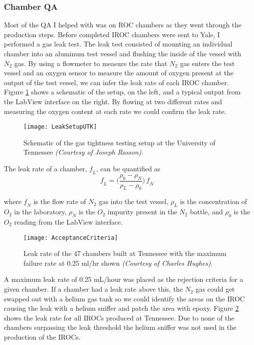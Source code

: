 \subsubsection{Chamber QA}

Most of the QA I helped with was on ROC chambers as they went through the production steps.  Before completed IROC chambers were sent to Yale, I performed a gas leak test.  The leak test consisted of mounting an individual chamber into an aluminum test vessel and flushing the inside of the vessel with $N_{2}$ gas.  By using a flowmeter to measure the rate that $N_{2}$ gas enters the test vessel and an oxygen sensor to measure the amount of oxygen present at the output of the test vessel, we can infer the leak rate of each IROC chamber.  Figure \ref{fig:LeakTest} shows a schematic of the setup, on the left, and a typical output from the LabView interface on the right.  By flowing at two different rates and measuring the oxygen content at each rate we could confirm the leak rate.

\begin{figure}[h]
\texttt{[image: LeakSetupUTK]}
\centering
\caption{Schematic of the gas tightness testing setup at the University of Tennessee \textit{(Courtesy of Joseph Rasson)}. }
\label{fig:LeakTest}
\end{figure}


The leak rate of a chamber, $\mathit{f_{L}}$,  can be quantified as
\begin{equation}
\mathit{f_{L}} =\Bigg(  \frac{\rho_{0} -\rho_{N}}{\rho_{L} -\rho_{0}} \Bigg) \,  \mathit{f_{N}}
\label{eq:leakrate}
\end{equation}

\noindent
where $\mathit{f_{N}}$ is the flow rate of $N_{2}$ gas into the test vessel, $\rho_{L}$ is the concentration of $O_{2}$ in the laboratory, $\rho_{N}$ is the $O_{2}$ impurity present in the $N_{2}$ bottle, and $\rho_{0}$ is the $O_{2}$ reading from the LabView interface.  

\begin{figure}[h]
\texttt{[image: AcceptanceCriteria]}
\centering
\caption{Leak rate of the 47 chambers built at Tennessee with the maximum failure rate at 0.25 ml/hr shown \textit{(Courtesy of Charles Hughes)}. }
\label{fig:IROCLeaK}
\end{figure}

\noindent
A maximum leak rate of 0.25 mL/hour was placed as the rejection criteria for a given chamber.  If a chamber had a leak rate above this, the $N_{2}$ gas could get swapped out with a helium gas tank so we could identify the areas on the IROC causing the leak with a helium sniffer and patch the area with epoxy.  Figure \ref{fig:IROCLeaK} shows the leak rate for all IROCs produced at Tennessee.  Due to none of the chambers surpassing the leak threshold the helium sniffer was not used in the production of the IROCs. 

